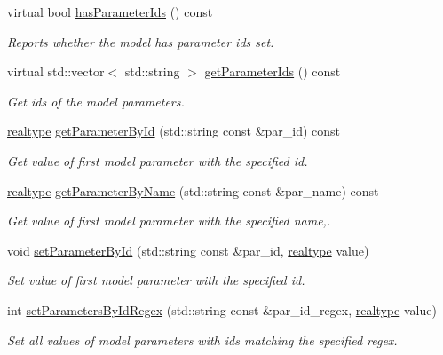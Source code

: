 \begin{DoxyCompactItemize}
virtual bool \mbox{\hyperlink{classamici_1_1_model_a216de46b6ca89c0bcc4f1c1418d2c06a}{has\+Parameter\+Ids}} () const
\begin{DoxyCompactList}\small\item\em Reports whether the model has parameter ids set. \end{DoxyCompactList}\item 
virtual std\+::vector$<$ std\+::string $>$ \mbox{\hyperlink{classamici_1_1_model_ad5647cbe7c4989a7692955cbdbf5b3cd}{get\+Parameter\+Ids}} () const
\begin{DoxyCompactList}\small\item\em Get ids of the model parameters. \end{DoxyCompactList}\item 
\mbox{\hyperlink{namespaceamici_a1bdce28051d6a53868f7ccbf5f2c14a3}{realtype}} \mbox{\hyperlink{classamici_1_1_model_a4436bd89ae2cb032cbf13db478d99e15}{get\+Parameter\+By\+Id}} (std\+::string const \&par\+\_\+id) const
\begin{DoxyCompactList}\small\item\em Get value of first model parameter with the specified id. \end{DoxyCompactList}\item 
\mbox{\hyperlink{namespaceamici_a1bdce28051d6a53868f7ccbf5f2c14a3}{realtype}} \mbox{\hyperlink{classamici_1_1_model_a19b349ca9793d45fda7ef8ea7422747a}{get\+Parameter\+By\+Name}} (std\+::string const \&par\+\_\+name) const
\begin{DoxyCompactList}\small\item\em Get value of first model parameter with the specified name,. \end{DoxyCompactList}\item 
void \mbox{\hyperlink{classamici_1_1_model_a995357a19663980279249d4b89a88f7a}{set\+Parameter\+By\+Id}} (std\+::string const \&par\+\_\+id, \mbox{\hyperlink{namespaceamici_a1bdce28051d6a53868f7ccbf5f2c14a3}{realtype}} value)
\begin{DoxyCompactList}\small\item\em Set value of first model parameter with the specified id. \end{DoxyCompactList}\item 
int \mbox{\hyperlink{classamici_1_1_model_ab66d6b754637ed68449af96f5887a0be}{set\+Parameters\+By\+Id\+Regex}} (std\+::string const \&par\+\_\+id\+\_\+regex, \mbox{\hyperlink{namespaceamici_a1bdce28051d6a53868f7ccbf5f2c14a3}{realtype}} value)
\begin{DoxyCompactList}\small\item\em Set all values of model parameters with ids matching the specified regex. \end{DoxyCompactList}\item 

\end{DoxyCompactItemize}
